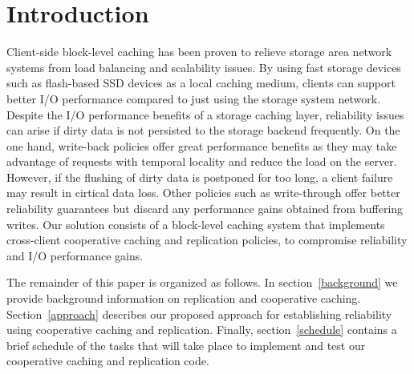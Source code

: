 \section{Introduction}

Client-side block-level caching has been proven to relieve storage area network systems from load balancing and scalability issues\cite{DM-Cache}\cite{visa-dm-cache}. By using fast storage devices such as flash-based SSD devices as a local caching medium, clients can support better I/O performance compared to just using the storage system network. Despite the I/O performance benefits of a storage caching layer, reliability issues can arise if dirty data is not persisted to the storage backend frequently. On the one hand, write-back policies offer great performance benefits as they may take advantage of requests with temporal locality and reduce the load on the server. However, if the flushing of dirty data is postponed for too long, a client failure may result in cirtical data loss. Other policies such as write-through offer better reliability guarantees but discard any performance gains obtained from buffering writes. Our solution consists of a block-level caching system that implements cross-client cooperative caching and replication policies, to compromise reliability and I/O performance gains.

The remainder of this paper is organized as follows. In section~\ref{background} we provide background information on replication and cooperative caching. Section~\ref{approach} describes our proposed approach for establishing reliability using cooperative caching and replication. Finally, section~\ref{schedule} contains a brief schedule of the tasks that will take place to implement and test our cooperative caching and replication code. 

\label{intro}
